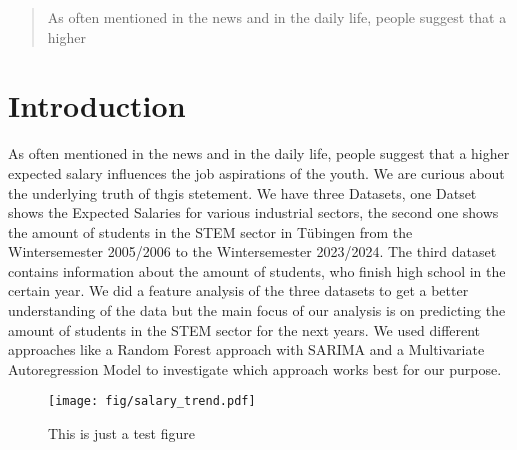 \documentclass{article}
\theoremstyle{plain}
\theoremstyle{definition}
\theoremstyle{remark}
\begin{document}
\printAffiliationsAndNotice{\icmlEqualContribution} %

\begin{abstract}
As often mentioned in the news and in the daily life, people suggest that a higher 
\end{abstract}

\section{Introduction}\label{sec:intro}
As often mentioned in the news and in the daily life, people suggest that a higher expected salary influences the job aspirations of the youth. 
We are curious about the underlying truth of thgis stetement. We have three Datasets, one Datset shows the Expected Salaries for various industrial sectors,
the second one shows the amount of students in the STEM sector in Tübingen from the Wintersemester 2005/2006 to the Wintersemester 2023/2024. 
The third dataset contains information about the amount of students, who finish high school in the certain year.
We did a feature analysis of the three datasets to get a better understanding of the data but the main focus of our analysis is on predicting 
the amount of students in the STEM sector for the next years. We used different approaches like a Random Forest approach with SARIMA
and a Multivariate Autoregression Model to investigate which approach works best for our purpose.

\begin{figure}[ht]
\vskip 0.2in
\begin{center}
\centerline{\texttt{[image: fig/salary\_trend.pdf]}}
\caption{This is just a test figure}
\label{icml-historical}
\end{center}
\vskip -0.2in
\end{figure}
\end{document}
